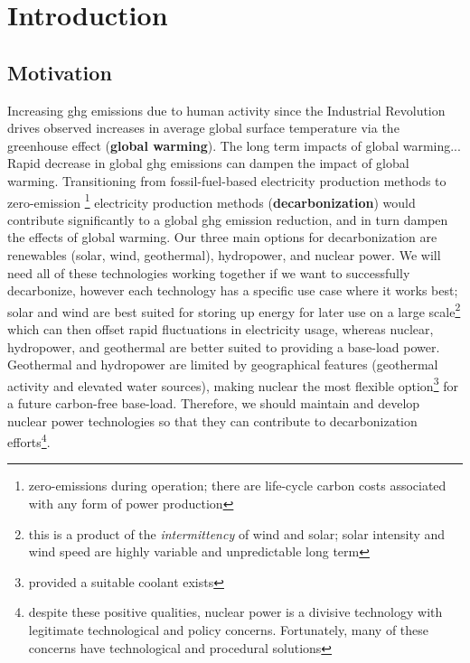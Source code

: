 \chapter{Introduction}%
\label{cha:introduction}

\section{Motivation}%
\label{sec:motivation}

Increasing \Gls{ghg} emissions due to human activity since the Industrial Revolution drives observed increases in average global surface temperature via the greenhouse effect\cite{mitchell_greenhouse_1989} \cite{paola_a_arias_2021_ts} (\textbf{global warming}).
The long term impacts of global warming...
Rapid decrease in global \Gls{ghg} emissions can dampen the impact of global warming. Transitioning from fossil-fuel-based electricity production methods to zero-emission \footnote{zero-emissions during operation; there are life-cycle carbon costs associated with any form of power production} electricity production methods (\textbf{decarbonization}) would contribute significantly to a global \Gls{ghg} emission reduction, and in turn dampen the effects of global
warming. Our three main options for decarbonization are renewables (solar, wind, geothermal), hydropower, and nuclear power. We will need all of these technologies working together if we want to successfully decarbonize, however each technology has a specific use case where it works best; solar and wind are best suited for storing up energy for later use on a large scale\footnote{this is a product of the {\it intermittency} of wind and solar; solar intensity and wind speed are highly
variable and unpredictable long term} which can then offset rapid fluctuations in electricity usage, whereas nuclear, hydropower, and geothermal are better suited to
providing a base-load power\cite{eia_electricity_2021}. Geothermal and hydropower are limited by geographical features (geothermal activity and elevated water sources), making nuclear the most flexible option\footnote{provided a suitable coolant exists} for a future carbon-free base-load. Therefore, we should maintain and develop nuclear power technologies so that they can contribute to decarbonization efforts\footnote{despite these positive qualities, nuclear power is a divisive technology with
    legitimate technological and policy concerns. Fortunately, many of these concerns have technological and
procedural solutions}.

